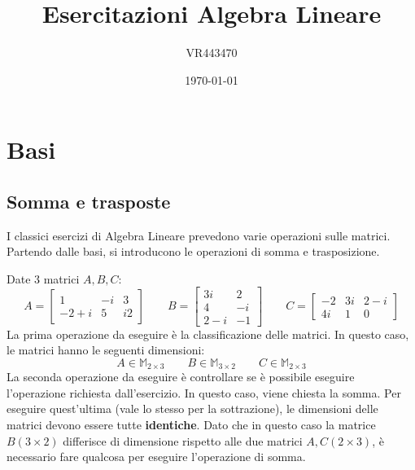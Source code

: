 \documentclass[a4paper]{article}
\begin{document}
	\author{VR443470}
	\title{Esercitazioni Algebra Lineare}
	\date{\printdayoff\today}
	\maketitle
	
	\newpage
	
	\tableofcontents
	
	\newpage
	
	\section{Basi}
	
	\subsection{Somma e trasposte}
	
	I classici esercizi di Algebra Lineare prevedono varie operazioni sulle matrici. Partendo dalle basi, si introducono le operazioni di somma e trasposizione.\newline
	
	\noindent
	Date $3$ matrici $A, B, C$:
	\begin{equation*}
		A = \begin{bmatrix}
			   1 & -i & 3 \\
			-2+i &  5 & i2
		\end{bmatrix} \hspace{2em}
		B = \begin{bmatrix}
			3i	& 2		\\
			4	& -i 	\\
			2-i	& -1
		\end{bmatrix} \hspace{2em}
		C = \begin{bmatrix}
			-2	& 3i	& 2-i	\\
			4i	& 1		& 0
		\end{bmatrix}
	\end{equation*}
	La \textcolor{Red3}{prima operazione} da eseguire è la classificazione delle matrici. In questo caso, le matrici hanno le seguenti dimensioni:
	\begin{equation*}
		A\in\mathbb{M}_{2\times3} \hspace{2em} B\in\mathbb{M}_{3\times2} \hspace{2em} C\in\mathbb{M}_{2\times3}
	\end{equation*}
	La \textcolor{Red3}{seconda operazione} da eseguire è controllare se è possibile eseguire l'operazione richiesta dall'esercizio. In questo caso, viene chiesta la somma. Per eseguire quest'ultima (vale lo stesso per la sottrazione), le dimensioni delle matrici devono essere tutte \textbf{identiche}. Dato che in questo caso la matrice $B \left(3\times2\right)$ differisce di dimensione rispetto alle due matrici $A,C \left(2\times3\right)$, è necessario fare qualcosa per eseguire l'operazione di somma.\newline
	
\end{document}
